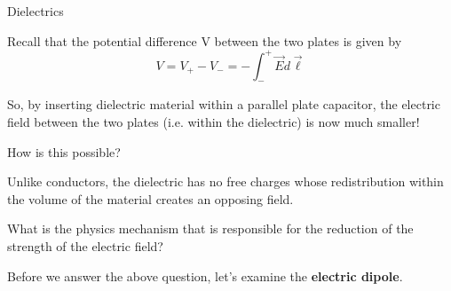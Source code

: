 %
%
%

\begin{frame}{Dielectrics}

Recall that the potential difference V between the two plates is given by
\begin{equation*}
  V = V_{+} - V_{-} = - \int_{-}^{+} \vec{E} d\vec{\ell}
\end{equation*}

\vspace{0.1cm}

So, by inserting dielectric material within a parallel plate capacitor,
the electric field between the two plates (i.e. within the dielectric) is now much smaller!\\

\vspace{0.2cm}

How is this possible?
\begin{itemize}
{\small
  \item Unlike conductors, the dielectric has no free charges whose redistribution within the
        volume of the material creates an opposing field.
  \item What is the physics mechanism that is responsible for the reduction of the strength
        of the electric field?
}
\end{itemize}

\vspace{0.2cm}

Before we answer the above question, let's examine the {\bf electric dipole}.\\

\end{frame}

%
%
%

